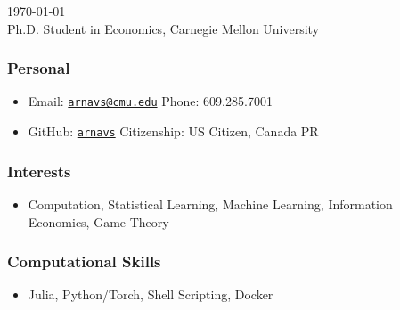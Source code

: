 \documentclass[12pt]{article}   %
\begin{document}
\renewcommand{\labelitemi}{~}

 \hfill \monthyeardate\today \\
\flushleft Ph.D. Student in Economics, Carnegie Mellon University

\subsubsection*{Personal}
\begin{itemize}
  \item Email: \href{mailto:arnavs@cmu.edu}{\texttt{arnavs@cmu.edu}} \hfill Phone: 609.285.7001
  \item GitHub: \href{https://github.com/arnavs}{\texttt{arnavs}} \hfill Citizenship: US Citizen, Canada PR
\end{itemize}

\subsubsection*{Interests}
\begin{itemize}
  \item Computation, Statistical Learning, Machine Learning, Information Economics, Game Theory
\end{itemize} 

\subsubsection*{Computational Skills}
\begin{itemize}
  \item Julia, Python/Torch, Shell Scripting, Docker
\end{itemize} 
\end{document}

